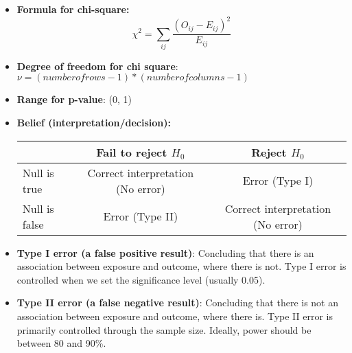 \documentclass[12pt]{article}
\begin{document}
\begin{itemize}
\item \textbf{Formula for chi-square:}
$$\chi^2=\sum_{ij}\frac{(O_{ij}-E_{ij})^2}{E_{ij}}$$
\item \textbf{Degree of freedom for chi square}: $\nu = (number of rows - 1) * (number of columns - 1)$
\item \textbf{Range for p-value}: (0, 1)
\item \textbf{Belief (interpretation/decision):}
\begin{table}[h!]
\centering
\begin{tabular}{|l|c|c|}
\hline
& Fail to reject $H_0$ & Reject $H_0$ \\ \hline
Null is true & Correct interpretation (No error) & Error (Type I) \\ \hline
Null is false & Error (Type II) & Correct interpretation (No error) \\
\hline
\end{tabular}
\end{table}
\item \textbf{Type I error (a false positive result)}: Concluding that there is an association between exposure and outcome, where there is not. Type I error is controlled when we set the significance level (usually 0.05).
\item \textbf{Type II error (a false negative result)}: Concluding that there is not an association between exposure and outcome, where there is. Type II error is primarily controlled through the sample size. Ideally, power should be between 80 and 90\%.
\end{itemize}
\end{document}
